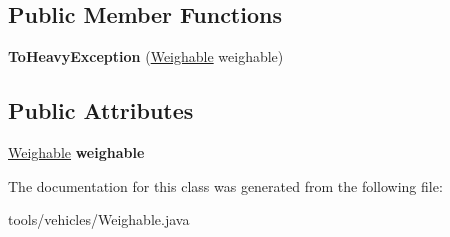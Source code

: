 \subsection*{Public Member Functions}
\begin{DoxyCompactItemize}
\item 
{\bfseries To\+Heavy\+Exception} (\hyperlink{interfacetools_1_1vehicles_1_1_weighable}{Weighable} weighable)\hypertarget{classtools_1_1vehicles_1_1_weighable_1_1_to_heavy_exception_a52d6c3db415d4769d50b095ab38daa4a}{}\label{classtools_1_1vehicles_1_1_weighable_1_1_to_heavy_exception_a52d6c3db415d4769d50b095ab38daa4a}

\end{DoxyCompactItemize}
\subsection*{Public Attributes}
\begin{DoxyCompactItemize}
\item 
\hyperlink{interfacetools_1_1vehicles_1_1_weighable}{Weighable} {\bfseries weighable}\hypertarget{classtools_1_1vehicles_1_1_weighable_1_1_to_heavy_exception_a94ab26b237ada29dd7d16a81337588e2}{}\label{classtools_1_1vehicles_1_1_weighable_1_1_to_heavy_exception_a94ab26b237ada29dd7d16a81337588e2}

\end{DoxyCompactItemize}


The documentation for this class was generated from the following file\+:\begin{DoxyCompactItemize}
\item 
tools/vehicles/Weighable.\+java\end{DoxyCompactItemize}
